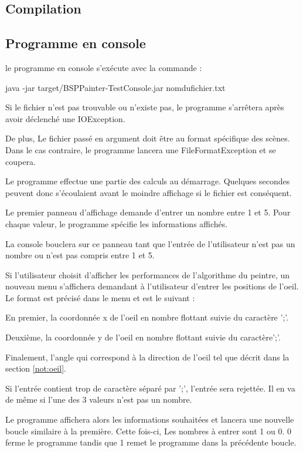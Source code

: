 \subsection{Compilation}
\subsection{Programme en console}
le programme en console s'exécute avec la commande :

java -jar target/BSPPainter-TestConsole.jar nomdufichier.txt

Si le fichier n'est pas trouvable ou n'existe pas, le programme s'arrêtera après avoir déclenché une IOException.

De plus, Le fichier passé en argument doit être au format spécifique des scènes. Dans le cas contraire, le programme lancera une FileFormatException et se coupera.

Le programme effectue une partie des calculs au démarrage. Quelques secondes peuvent donc s'écoulaient avant le moindre affichage si le fichier est conséquent.

Le premier panneau d'affichage demande d'entrer un nombre entre 1 et 5. Pour chaque valeur, le programme spécifie les informations affichés.

La console bouclera sur ce panneau tant que l'entrée de l'utilisateur n'est pas un nombre ou n'est pas compris entre 1 et 5.

Si l'utilisateur choisit d'afficher les performances de l'algorithme du peintre, un nouveau menu s'affichera demandant à l'utilisateur d'entrer les positions de l'oeil. Le format est précisé dans le menu et est le suivant :

En premier, la coordonnée x de l'oeil en nombre flottant suivie du caractère ';'.

Deuxième, la coordonnée y de l'oeil en nombre flottant suivie du caractère';'.

Finalement, l'angle qui correspond à la direction de l'oeil tel que décrit dans la section \ref{not:oeil}.

Si l'entrée contient trop de caractère séparé par ';', l'entrée sera rejettée. Il en va de même si l'une des 3 valeurs n'est pas un nombre. 

Le programme affichera alors les informations souhaitées et lancera une nouvelle boucle similaire à la première. Cette fois-ci, Les nombres à entrer sont 1 ou 0. 0 ferme le programme tandis que 1 remet le programme dans la précédente boucle.

